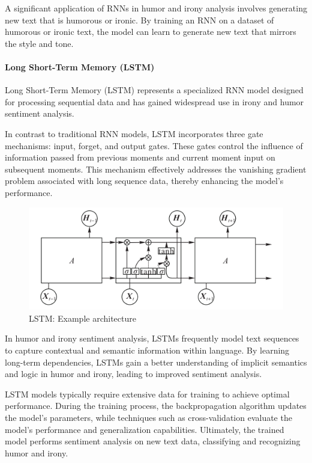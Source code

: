 \documentclass[a4paper]{article}
\begin{document}
A significant application of RNNs in humor and irony analysis involves generating new text that is humorous or ironic. By training an RNN on a dataset of humorous or ironic text, the model can learn to generate new text that mirrors the style and tone.

\paragraph{Long Short-Term Memory (LSTM)}

Long Short-Term Memory (LSTM) represents a specialized RNN model designed for processing sequential data and has gained widespread use in irony and humor sentiment analysis.

In contrast to traditional RNN models, LSTM incorporates three gate mechanisms: input, forget, and output gates. These gates control the influence of information passed from previous moments and current moment input on subsequent moments. This mechanism effectively addresses the vanishing gradient problem associated with long sequence data, thereby enhancing the model's performance.

\begin{figure}[H]
	\centering
	\includegraphics[width=1\textwidth]{./images/LSTM_architecture.png}
	\caption{LSTM: Example architecture}
	\label{fig.LSTM[Review of applications of natural language processing in text sentiment analysis]}
\end{figure}

In humor and irony sentiment analysis, LSTMs frequently model text sequences to capture contextual and semantic information within language. By learning long-term dependencies, LSTMs gain a better understanding of implicit semantics and logic in humor and irony, leading to improved sentiment analysis.

LSTM models typically require extensive data for training to achieve optimal performance. During the training process, the backpropagation algorithm updates the model's parameters, while techniques such as cross-validation evaluate the model's performance and generalization capabilities. Ultimately, the trained model performs sentiment analysis on new text data, classifying and recognizing humor and irony.
\end{document}
